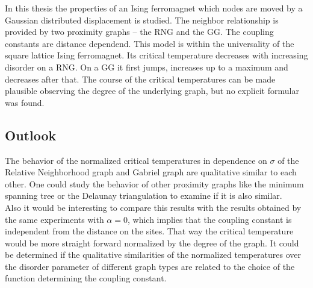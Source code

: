 In this thesis the properties of an Ising ferromagnet which nodes are
moved by a Gaussian distributed displacement is studied. The neighbor
relationship is provided by two proximity graphs -- the RNG and the GG.
The coupling constants are distance dependend. This model is within the
universality of the square lattice Ising ferromagnet. Its critical temperature
decreases with increasing disorder on a RNG. On a GG it first jumps,
increases up to a maximum and decreases after that. The course of the
critical temperatures can be made plausible observing the degree of the
underlying graph, but no explicit formular was found.

\subsection{Outlook}
    The behavior of the normalized critical temperatures in dependence
    on \(\sigma\) of the Relative Neighborhood graph and Gabriel graph
    are qualitative similar to each other. One could study the behavior
    of other proximity graphs like the minimum spanning tree or the
    Delaunay triangulation to examine if it is also similar.\\
    Also it would be interesting to compare this results with the
    results obtained by the same experiments with \(\alpha = 0\), which
    implies that the coupling constant is independent from the distance
    on the sites. That way the critical temperature would be more
    straight forward normalized by the degree of the graph. It
    could be determined if the qualitative similarities of the
    normalized temperatures over the disorder parameter of different
    graph types are related to the choice of the function determining the
    coupling constant.
